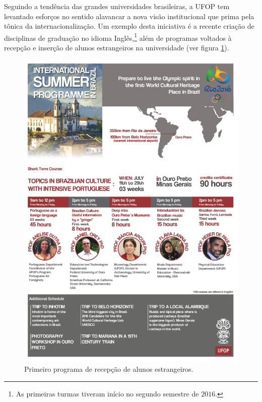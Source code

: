 Seguindo a tendência das grandes universidades brasileiras, a UFOP tem levantado esforços no sentido alavancar a nova visão institucional \cite{resolucao-cuni-1} que prima pela tônica da internacionalização. Um exemplo desta iniciativa é a recente criação de disciplinas de graduação no idioma Inglês,\footnote{As primeiras turmas tiveram início no segundo semestre de $2016$.} além de programas voltados à recepção e inserção de alunos estrangeiros na universidade (ver figura \ref{fig:01}).
%
\begin{figure}[!bpt]
	\centering
	\includegraphics[scale=0.5]{figuras/Summer_Course1.jpg}
	\caption{Primeiro programa de recepção de alunos estrangeiros.}
	\label{fig:01}
\end{figure}
%
